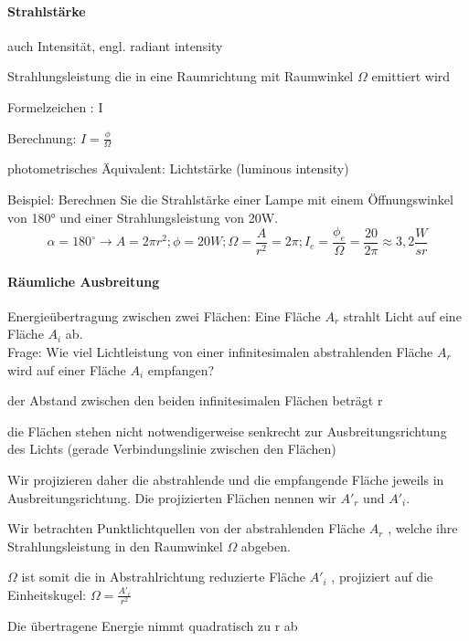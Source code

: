 \documentclass[landscape]{article}
\begin{document}
\begin{multicols}{3}
  \paragraph{Strahlstärke}
  \begin{itemize*}
    \item auch Intensität, engl. radiant intensity
    \item Strahlungsleistung die in eine Raumrichtung mit Raumwinkel $\Omega$ emittiert wird
    \item Formelzeichen : I
    \item Berechnung: $I=\frac{\phi}{\Omega}$
    \item photometrisches Äquivalent: Lichtstärke (luminous intensity)
  \end{itemize*}
  
  Beispiel: Berechnen Sie die Strahlstärke einer Lampe mit einem Öffnungswinkel von 180° und einer Strahlungsleistung von 20W.
  $$\alpha=180^{\circ}\rightarrow A=2\pi r^2; \phi =20W; \Omega=\frac{A}{r^2}=2\pi ; I_e=\frac{\phi_e}{\Omega}=\frac{20}{2\pi}\approx 3,2 \frac{W}{sr}$$
  
  \paragraph{Räumliche Ausbreitung}
  Energieübertragung zwischen zwei Flächen:
  Eine Fläche $A_r$ strahlt Licht auf eine Fläche $A_i$ ab.\\
  Frage: Wie viel Lichtleistung von einer infinitesimalen abstrahlenden Fläche $A_r$ wird auf einer Fläche $A_i$ empfangen?
  \begin{itemize*}
    \item der Abstand zwischen den beiden infinitesimalen Flächen beträgt r
    \item die Flächen stehen nicht notwendigerweise senkrecht zur Ausbreitungsrichtung des Lichts (gerade Verbindungslinie zwischen den Flächen)
    \item Wir projizieren daher die abstrahlende und die empfangende Fläche jeweils in Ausbreitungsrichtung. Die projizierten Flächen nennen wir $A'_r$ und $A'_i$.
    \item Wir betrachten Punktlichtquellen von der abstrahlenden Fläche $A_r$ , welche ihre Strahlungsleistung in den Raumwinkel $\Omega$ abgeben.
    \item $\Omega$ ist somit die in Abstrahlrichtung reduzierte Fläche $A'_i$ , projiziert auf die Einheitskugel: $\Omega=\frac{A'_i}{r^2}$
    \item Die übertragene Energie nimmt quadratisch zu r ab
  \end{itemize*}
  

\end{multicols}
\end{document}
